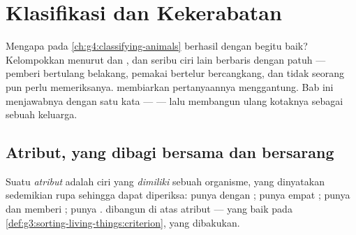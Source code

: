 \chapter{Klasifikasi dan Kekerabatan}\label{ch:g6:classification-kinship}

Mengapa  pada \cref{ch:g4:classifying-animals} berhasil
dengan begitu baik? Kelompokkan  menurut  dan ,
dan seribu ciri lain berbaris dengan patuh --- pemberi  bertulang
belakang, pemakai  bertelur bercangkang, dan tidak seorang
pun perlu memeriksanya. 
membiarkan pertanyaannya menggantung. Bab ini menjawabnya dengan satu
kata ---  --- lalu membangun ulang kotaknya sebagai sebuah
 keluarga.

\section{Atribut, yang dibagi bersama dan bersarang}

\begin{definition}[Atribut]\label{def:g6:classification-kinship:attribute}
Suatu \emph{atribut} adalah ciri yang \emph{dimiliki}
sebuah organisme, yang dinyatakan sedemikian rupa sehingga dapat
diperiksa: punya  dengan ; punya empat ; punya  dan memberi ; punya . 
dibangun di atas atribut ---  yang baik pada
\cref{def:g3:sorting-living-things:criterion}, yang dibakukan.
\end{definition}

